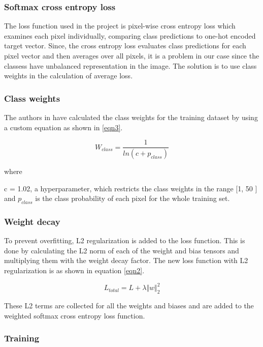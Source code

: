 \documentclass[a4paper, 12pt, oneside, BCOR1cm,toc=chapterentrywithdots]{scrbook}
\begin{document}
\subsubsection{Softmax cross entropy loss}

The loss function used in the project is pixel-wise cross entropy loss which examines each pixel individually, comparing class predictions to one-hot encoded target vector. Since, the cross entropy loss evaluates class predictions for each pixel vector and then averages over all pixels, it is a problem in our case since the classess have unbalanced representation in the image. The solution is to use class weights in the calculation of average loss.

\subsubsection{Class weights}

The authors in \cite{Paszke2017ENetAD} have calculated the class weights for the training dataset by using a custom equation as shown in \ref{eqn3}.


\begin{equation} \label{eqn3}
W_{class} = \frac{1}{ln(c+p_{class})}
\end{equation}

where 

c = 1.02, a hyperparameter, which restricts the class weights in the range [1, 50 ] and 
$p_{class}$ is the class probability of each pixel for the whole training set.


\subsubsection{Weight decay}

To prevent overfitting, L2 regularization is added to the loss function. This is done by calculating the L2 norm of each of the weight and bias tensors and multiplying them with the weight decay factor. The new loss function with L2 regularization is as shown in equation \ref{eqn2}.


\begin{equation} \label{eqn2}
L_{total} = L + \lambda\Vert w \Vert _{2}^2
\end{equation}

These L2 terms are collected for all the weights and biases and are added to the weighted softmax cross entropy loss function.


\subsubsection{Training}
\end{document}
